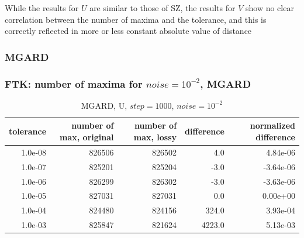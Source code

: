 \begin{frame}[fragile]
  {\tiny
    While the results for $U$ are similar to those of SZ, the results for $V$ show no clear correlation between the number of maxima and the tolerance, and this is correctly reflected in more or less constant absolute value of distance
  }
\end{frame}



\subsubsection{MGARD}
\begin{frame}[fragile]
  \frametitle{FTK: number of maxima for $noise = 10^{-2}$, MGARD }

  {\tiny
\begin{table}[H]
\centering
\begin{tabular}{|r|r|r|r|r|}
\hline
tolerance &         number of max, original &         number of max, lossy &       difference & normalized difference \\
\hline

  1.0e-08 &           826506 &        826502 &             4.0 &       4.84e-06 \\
\hline
  1.0e-07 &           825201 &        825204 &            -3.0 &      -3.64e-06 \\
\hline
  1.0e-06 &           826299 &        826302 &            -3.0 &      -3.63e-06 \\
\hline
  1.0e-05 &           827031 &        827031 &             0.0 &       0.00e+00 \\
\hline
  1.0e-04 &           824480 &        824156 &           324.0 &       3.93e-04 \\
\hline
  1.0e-03 &           825847 &        821624 &          4223.0 &       5.13e-03 \\
\hline
\end{tabular}
\caption{MGARD, U, $step = 1000$, $noise = 10^{-2}$}
\label{mgard_u_table}
\end{table}

  }


\end{frame}

